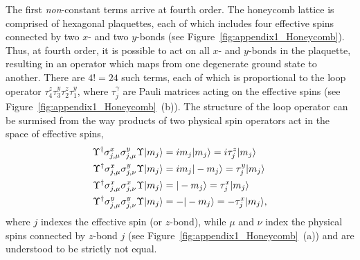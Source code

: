 The first \textit{non}-constant terms arrive at fourth order.
The honeycomb lattice is comprised of hexagonal plaquettes, each of which includes four effective spins connected by two $x$- and two $y$-bonds (see Figure~\ref{fig:appendix1_Honeycomb}).
Thus, at fourth order, it is possible to act on all $x$- and $y$-bonds in the plaquette, resulting in an operator which maps from one degenerate ground state to another.
There are $4! = 24$ such terms, each of which is proportional to the loop operator $\tau_4^z \tau_3^y \tau_2^z \tau_1^y$, where $\tau_j^\gamma$ are Pauli matrices acting on the effective spins (see Figure~\ref{fig:appendix1_Honeycomb}~(b)).
The structure of the loop operator can be surmised from the way products of two physical spin operators act in the space of effective spins,
%
\begin{align}
	\Upsilon^{\dagger} \sigma_{j,\mu}^x \sigma_{j,\mu}^y \Upsilon | m_j \rangle &= i m_j | m_j \rangle = i \tau_j^z | m_j \rangle \nonumber\\
	\Upsilon^{\dagger} \sigma_{j,\mu}^x \sigma_{j,\nu}^y \Upsilon | m_j \rangle &= i m_j | -m_j \rangle = \tau_j^y | m_j \rangle \nonumber\\
	\Upsilon^{\dagger} \sigma_{j,\mu}^x \sigma_{j,\nu}^x \Upsilon | m_j \rangle &= | -m_j \rangle = \tau_j^x | m_j \rangle \nonumber\\
	\Upsilon^{\dagger} \sigma_{j,\mu}^y \sigma_{j,\nu}^y \Upsilon | m_j \rangle &= -| -m_j \rangle = -\tau_j^x | m_j \rangle,
	\label{eq:appendix1_SpinRules}
\end{align}
%
where $j$ indexes the effective spin (or $z$-bond), while $\mu$ and $\nu$ index the physical spins connected by $z$-bond $j$ (see Figure~\ref{fig:appendix1_Honeycomb}~(a)) and are understood to be strictly not equal.

